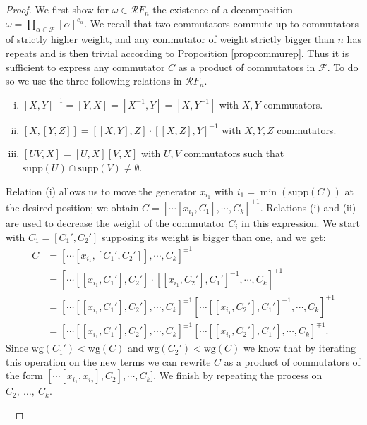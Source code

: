 \documentclass[11pt, a4paper, twoside,reqno]{amsart}
\newcommand\supp{\mathord{\mathrm{supp}}}
\newcommand\wg{\mathord{\mathrm{wg}}}
\begin{document}
\begin{proof}
We first show for $\omega\in\mathcal RF_n$ the existence of a decomposition $\omega=\prod_{\alpha\in\mathcal{F}}[\alpha]^{e_\alpha}$. We recall that two commutators commute up to commutators of strictly higher weight, and any commutator of weight strictly bigger than $n$ has repeats and is then trivial according to Proposition \ref{propcommurep}. Thus it is sufficient to express any commutator $C$ as a product of commutators in $\mathcal{F}$. To do so we use the three following relations in $\mathcal RF_n$.
\begin{enumerate}[(i)]
    \item $[X,Y]^{-1}=[Y,X]=[X^{-1},Y]=[X,Y^{-1}]$ with $X,Y$ commutators.
    \item $[X,[Y,Z]]=[[X,Y],Z]\cdot[[X,Z],Y]^{-1}$ with $X,Y,Z$ commutators.
    \item $[UV,X]=[U,X][V,X]$ with $U,V$ commutators such that $\supp(U)\cap \supp(V)\neq\emptyset$.
\end{enumerate}
Relation (i) allows us to move the generator $x_{i_1}$ with $i_1=\min(\supp(C))$ at the desired position; we obtain $C=[\cdots[x_{i_1},C_1],\cdots ,C_k]^{\pm1}$. Relations (i) and (ii) are used to decrease the weight of the commutator $C_i$ in this expression. We start with $C_1=[C_1',C_2']$ supposing its weight is bigger than one, and we get:
\begin{align*}
    C&=[\cdots[x_{i_1},[C_1',C_2']],\cdots,C_k]^{\pm1}\\
    &=[\cdots[[x_{i_1},C_1'],C_2']\cdot[[x_{i_1},C_2'],C_1']^{-1},\cdots,C_k]^{\pm1}\\
    &=[\cdots[[x_{i_1},C_1'],C_2'],\cdots,C_k]^{\pm1}[\cdots[[x_{i_1},C_2'],C_1']^{-1},\cdots,C_k]^{\pm1}\\
    &=[\cdots[[x_{i_1},C_1'],C_2'],\cdots,C_k]^{\pm1}[\cdots[[x_{i_1},C_2'],C_1'],\cdots,C_k]^{\mp1}.
\end{align*} 
Since $\wg(C_1')<\wg(C)$ and $\wg(C_2')<\wg(C)$ we know that by iterating this operation on the new terms we can rewrite $C$ as a product of commutators of the form $[\cdots[x_{i_1},x_{i_2}],C_2],\cdots ,C_k]$. We finish by repeating the process on $C_2,\ \ldots,\ C_k$.

\


\end{proof}
\end{document}

